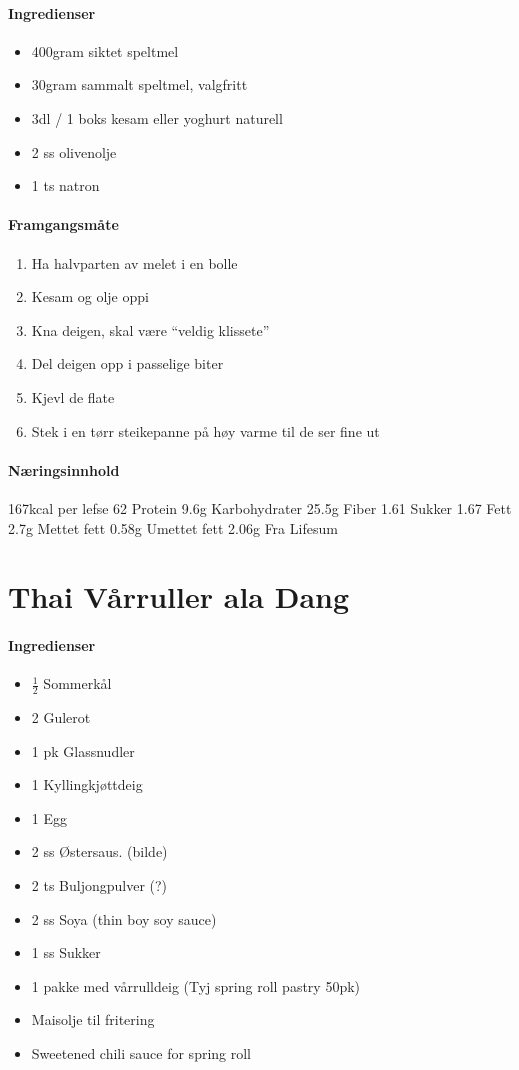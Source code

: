 \documentclass[12pt,a4paper]{book}
\begin{document}
{\paragraph{Ingredienser}
\begin{itemize}[noitemsep]
	\item 400gram siktet speltmel
	\item 30gram sammalt speltmel, valgfritt
	\item 3dl / 1 boks kesam eller yoghurt naturell
	\item 2 ss olivenolje
	\item 1 ts natron
\end{itemize}

\paragraph{Framgangsmåte}
\begin{enumerate}[noitemsep]
	\item Ha halvparten av melet i en bolle
	\item Kesam og olje oppi
	\item Kna deigen, skal være “veldig klissete”
	\item Del deigen opp i passelige biter
	\item Kjevl de flate
	\item Stek i en tørr steikepanne på høy varme til de ser fine ut
\end{enumerate}

\paragraph{Næringsinnhold}
167kcal per lefse
62
Protein 9.6g
Karbohydrater 25.5g
	Fiber 1.61
	Sukker 1.67
Fett 2.7g
	Mettet fett 0.58g
	Umettet fett 2.06g
Fra Lifesum
\clearpage{}
\clearpage{}\section{﻿Thai Vårruller ala Dang}


\paragraph{Ingredienser}
\begin{itemize}[noitemsep]
	\item  $\frac{1}{2}$  Sommerkål
	\item 2 Gulerot
	\item 1 pk Glassnudler
	\item 1 Kyllingkjøttdeig
	\item 1 Egg
	\item 2 ss Østersaus. (bilde)
	\item 2 ts Buljongpulver (?)
	\item 2 ss Soya (thin boy soy sauce)
	\item 1 ss Sukker
	\item 1 pakke med vårrulldeig (Tyj spring roll pastry 50pk)
	\item Maisolje til fritering
	\item Sweetened chili sauce for spring roll
\end{itemize}

}
\end{document}
